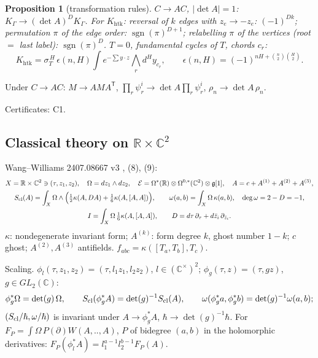 \documentclass[10pt,a4paper]{article}
\numberwithin{equation}{section}
\newtheorem{proposition}[theorem]{Proposition}
\theoremstyle{definition}
\theoremstyle{remark}
\newcommand{\sgn}{\operatorname{sgn}}
\newcommand{\g}{\mathfrak g}
\newcommand{\zb}{\bar z}
\newcommand{\htk}{\mathrm{htk}}
\newcommand{\cert}[1]{\par\noindent\textup{Certificates: #1.}\par}
\begin{document}
\begin{proposition}[transformation rules]\label{prop-rules}
$C\to AC$, $|\det A|=1$: $K_\Gamma\to(\det A)^{D}K_\Gamma$. For $K_\htk$: reversal of $k$ edges with $z_e\to-z_e$: $(-1)^{Dk}$; permutation $\pi$ of the edge order: $\sgn(\pi)^{D+1}$; relabelling $\pi$ of the vertices (root $=$ last label): $\sgn(\pi)^D$. $T=0$, fundamental cycles of $T$, chords $c_r$:
\begin{equation}
K_\htk=\sigma_T^{\,H}\,\epsilon(n,H)\int e^{-\sum y\cdot z}\bigwedge_rd^Hy_{c_r},\qquad \epsilon(n,H)=(-1)^{nH+\binom n2\binom H2}.
\end{equation}
\end{proposition}
Under $C\to AC$: $M\to AMA^{\mathsf T}$, $\prod_r\psi^i_r\to\det A\prod_r\psi^i_r$, $\rho_n\to\det A\,\rho_n$.
\cert{C1}

\subsection{\texorpdfstring{Classical theory on $\mathbb R\times\mathbb C^2$}{Classical theory on R x C2}}\label{sec-classical}

Wang--Williams 2407.08667 v3 \cite{WW}, (8), (9):
\begin{gather}
X=\mathbb R\times\mathbb C^2\ni(\tau,z_1,z_2),\quad \Omega=dz_1\wedge dz_2,\quad \mathcal E=\Omega^*(\mathbb R)\otimes\Omega^{0,*}(\mathbb C^2)\otimes\g[1],\quad A=c+A^{(1)}+A^{(2)}+A^{(3)},\\
S_{\rm cl}(A)=\int_X\Omega\wedge\Big(\tfrac12\kappa(A,DA)+\tfrac16\kappa(A,[A,A])\Big),\qquad \omega(a,b)=\int_X\Omega\,\kappa(a,b),\quad \deg\omega=2-D=-1,\\
I=\int_X\Omega\,\tfrac16\kappa(A,[A,A]),\qquad D=d\tau\,\partial_\tau+d\zb_i\,\partial_{\zb_i}.
\end{gather}
$\kappa$: nondegenerate invariant form; $A^{(k)}$: form degree $k$, ghost number $1-k$; $c$ ghost; $A^{(2)},A^{(3)}$ antifields. $f_{abc}=\kappa([T_a,T_b],T_c)$.

Scaling. $\phi_l(\tau,z_1,z_2)=(\tau,l_1z_1,l_2z_2)$, $l\in(\mathbb C^\times)^2$; $\phi_g(\tau,z)=(\tau,gz)$, $g\in GL_2(\mathbb C)$:
\begin{equation}
\phi_g^*\Omega=\det(g)\,\Omega,\qquad S_{\rm cl}(\phi_g^*A)=\det(g)^{-1}S_{\rm cl}(A),\qquad \omega(\phi_g^*a,\phi_g^*b)=\det(g)^{-1}\omega(a,b);
\end{equation}
$(S_{\rm cl}/\hbar,\omega/\hbar)$ is invariant under $A\to\phi_g^*A$, $\hbar\to\det(g)^{-1}\hbar$. For $F_P=\int\Omega\,P(\partial)W(A,..,A)$, $P$ of bidegree $(a,b)$ in the holomorphic derivatives: $F_P(\phi_l^*A)=l_1^{a-1}l_2^{b-1}F_P(A)$.
\end{document}
